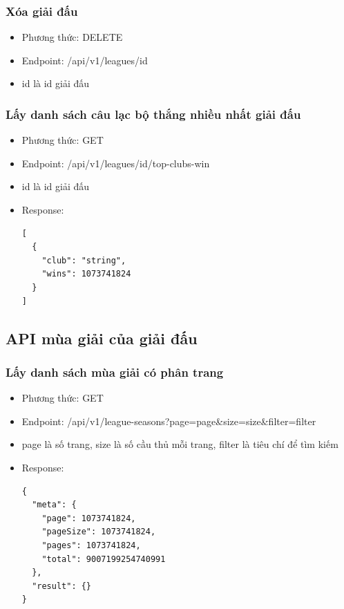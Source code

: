 \documentclass[../BTL.tex]{subfiles}
\begin{document}
\subsubsection{ Xóa giải đấu}
\begin{itemize}
    \item Phương thức: DELETE
    \item Endpoint: /api/v1/leagues/{id}
    \item {id} là id giải đấu
\end{itemize}

\subsubsection{ Lấy danh sách câu lạc bộ thắng nhiều nhất giải đấu}
\begin{itemize}
    \item Phương thức: GET
    \item Endpoint: /api/v1/leagues/{id}/top-clubs-win
    \item {id} là id giải đấu
    \item Response:
        \begin{verbatim}
[
  {
    "club": "string",
    "wins": 1073741824
  }
]
        \end{verbatim}
\end{itemize}
\subsection{ API mùa giải của giải đấu}
\subsubsection{ Lấy danh sách mùa giải có phân trang}
\begin{itemize}
    \item Phương thức: GET
    \item Endpoint: /api/v1/league-seasons?page={page}\&size={size}\&filter={filter}
    \item {page} là số trang, {size} là số cầu thủ mỗi trang, {filter} là tiêu chí để tìm kiếm
    \item Response:
        \begin{verbatim}
{
  "meta": {
    "page": 1073741824,
    "pageSize": 1073741824,
    "pages": 1073741824,
    "total": 9007199254740991
  },
  "result": {}
}
        \end{verbatim}
\end{itemize}
\end{document}
